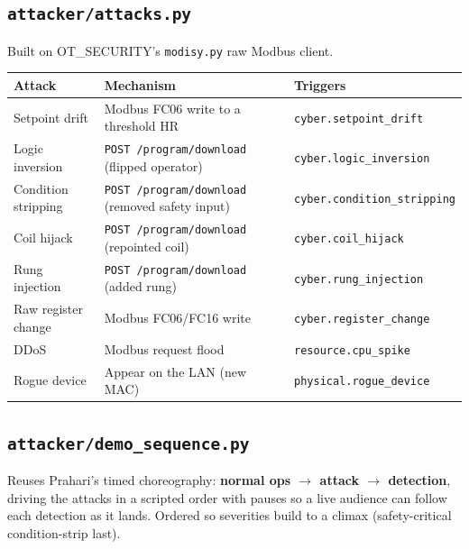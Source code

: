 \documentclass[11pt,a4paper]{article}
\newcommand{\code}[1]{\texttt{\small #1}}
\begin{document}
\subsection{\texttt{attacker/attacks.py}}
Built on OT\_SECURITY's \code{modisy.py} raw Modbus client.

\begin{tabularx}{\textwidth}{@{}p{3.0cm} L p{3.4cm}@{}}
\toprule
\textbf{Attack} & \textbf{Mechanism} & \textbf{Triggers} \\
\midrule
Setpoint drift & Modbus FC06 write to a threshold HR & \code{cyber.setpoint\_drift} \\
Logic inversion & \code{POST /program/download} (flipped operator) & \code{cyber.logic\_inversion} \\
Condition stripping & \code{POST /program/download} (removed safety input) & \code{cyber.condition\_stripping} \\
Coil hijack & \code{POST /program/download} (repointed coil) & \code{cyber.coil\_hijack} \\
Rung injection & \code{POST /program/download} (added rung) & \code{cyber.rung\_injection} \\
Raw register change & Modbus FC06/FC16 write & \code{cyber.register\_change} \\
DDoS & Modbus request flood & \code{resource.cpu\_spike} \\
Rogue device & Appear on the LAN (new MAC) & \code{physical.rogue\_device} \\
\bottomrule
\end{tabularx}

\subsection{\texttt{attacker/demo\_sequence.py}}
Reuses Prahari's timed choreography: \textbf{normal ops $\rightarrow$ attack $\rightarrow$ detection},
driving the attacks in a scripted order with pauses so a live audience can follow each detection as it
lands. Ordered so severities build to a climax (safety-critical condition-strip last).

\end{document}
